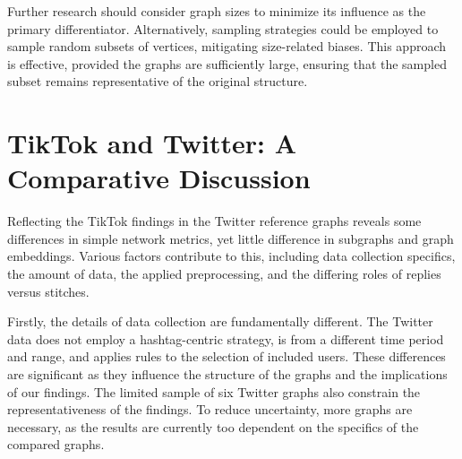 Further research should consider graph sizes to minimize its influence as the primary differentiator. Alternatively, sampling strategies could be employed to sample random subsets of vertices, mitigating size-related biases. This approach is effective, provided the graphs are sufficiently large, ensuring that the sampled subset remains representative of the original structure.





\section{TikTok and Twitter: A Comparative Discussion}
Reflecting the TikTok findings in the Twitter reference graphs reveals some differences in simple network metrics, yet little difference in subgraphs and graph embeddings. Various factors contribute to this, including data collection specifics, the amount of data, the applied preprocessing, and the differing roles of replies versus stitches.

Firstly, the details of data collection are fundamentally different. The Twitter data does not employ a hashtag-centric strategy, is from a different time period and range, and applies rules to the selection of included users. These differences are significant as they influence the structure of the graphs and the implications of our findings. The limited sample of six Twitter graphs also constrain the representativeness of the findings. To reduce uncertainty, more graphs are necessary, as the results are currently too dependent on the specifics of the compared graphs.

